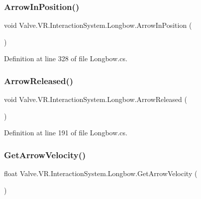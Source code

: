 \subsubsection{\texorpdfstring{ArrowInPosition()}{ArrowInPosition()}}
{\footnotesize\ttfamily void Valve.\+V\+R.\+Interaction\+System.\+Longbow.\+Arrow\+In\+Position (\begin{DoxyParamCaption}{ }\end{DoxyParamCaption})}



Definition at line 328 of file Longbow.\+cs.

\mbox{\label{class_valve_1_1_v_r_1_1_interaction_system_1_1_longbow_a1c9904dc841fdd685790ac4b5568dd0a}} 
\subsubsection{\texorpdfstring{ArrowReleased()}{ArrowReleased()}}
{\footnotesize\ttfamily void Valve.\+V\+R.\+Interaction\+System.\+Longbow.\+Arrow\+Released (\begin{DoxyParamCaption}{ }\end{DoxyParamCaption})}



Definition at line 191 of file Longbow.\+cs.

\mbox{\label{class_valve_1_1_v_r_1_1_interaction_system_1_1_longbow_a527b263071c9dc84cae6571626ad6a70}} 
\subsubsection{\texorpdfstring{GetArrowVelocity()}{GetArrowVelocity()}}
{\footnotesize\ttfamily float Valve.\+V\+R.\+Interaction\+System.\+Longbow.\+Get\+Arrow\+Velocity (\begin{DoxyParamCaption}{ }\end{DoxyParamCaption})}



